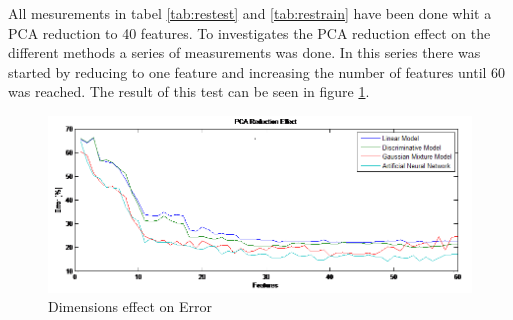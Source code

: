 All mesurements in tabel \ref{tab:restest} and \ref{tab:restrain} have been done whit a PCA reduction to 40 features. To investigates the PCA reduction effect on the different methods a series of measurements was done. In this series there was started by reducing to one feature and increasing the number of features until 60 was reached. The result of this test can be seen in figure \ref{fig:DimError}.

\begin{figure}[H]
\centering
\includegraphics[scale=0.7]{billeder/PCAReductionEffect}
\caption{ Dimensions effect on Error }
\label{fig:DimError}
\end{figure}

